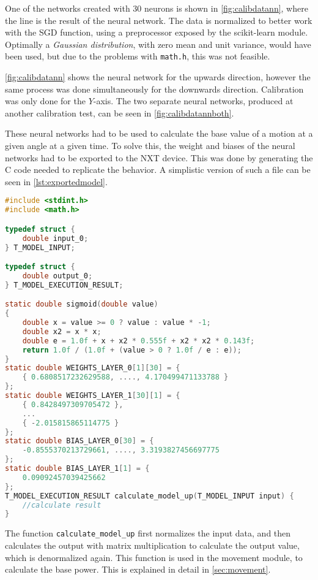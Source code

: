 One of the networks created with 30 neurons is shown in \autoref{fig:calibdatann}, where the line is the result of the neural network.
The data is normalized to better work with the SGD function, using a preprocessor exposed by the scikit-learn module.
Optimally a \textit{Gaussian distribution}, with zero mean and unit variance, would have been used, but due to the problems with \texttt{math{.}h}, this was not feasible.


\autoref{fig:calibdatann} shows the neural network for the upwards direction, however the same process was done simultaneously for the downwards direction.
Calibration was only done for the $Y$-axis.
The two separate neural networks, produced at another calibration test, can be seen in \autoref{fig:calibdatannboth}.



These neural networks had to be used to calculate the base value of a motion at a given angle at a given time.
To solve this, the weight and biases of the neural networks had to be exported to the NXT device.
This was done by generating the C code needed to replicate the behavior.
A simplistic version of such a file can be seen in \autoref{lst:exportedmodel}.


\begin{lstlisting}[language=C,label={lst:exportedmodel},firstnumber={1},caption={Autogenerated model for getting power to move up}]
#include <stdint.h>
#include <math.h>

typedef struct {
	double input_0;
} T_MODEL_INPUT;

typedef struct {
	double output_0;
} T_MODEL_EXECUTION_RESULT;

static double sigmoid(double value)
{
	double x = value >= 0 ? value : value * -1;
	double x2 = x * x;
	double e = 1.0f + x + x2 * 0.555f + x2 * x2 * 0.143f;
	return 1.0f / (1.0f + (value > 0 ? 1.0f / e : e));
}
static double WEIGHTS_LAYER_0[1][30] = {
	{ 0.6808517232629588, ...., 4.170499471133788 }
};
static double WEIGHTS_LAYER_1[30][1] = {
	{ 0.8428497309705472 },
	...
	{ -2.015815865114775 }
};
static double BIAS_LAYER_0[30] = {
	-0.8555370213729661, ...., 3.3193827456697775
};
static double BIAS_LAYER_1[1] = {
	0.09092457039425662
};
T_MODEL_EXECUTION_RESULT calculate_model_up(T_MODEL_INPUT input) {
	//calculate result
}

\end{lstlisting}
The function \texttt{calculate\_model\_up} first normalizes the input data, and then calculates the output with matrix multiplication to calculate the output value, which is denormalized again.
This function is used in the movement module, to calculate the base power.
This is explained in detail in \autoref{sec:movement}.


